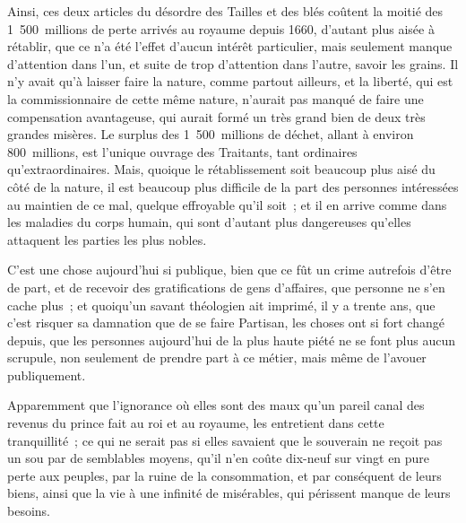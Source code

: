\documentclass[french,twoside]{book} %
\begin{document}
Ainsi, ces deux articles du désordre des Tailles et des blés coûtent la moitié des 1 500 millions de perte arrivés au royaume depuis 1660, d’autant plus aisée à rétablir, que ce n’a été l’effet d’aucun intérêt particulier, mais seulement manque d’attention dans l’un, et suite de trop d’attention dans l’autre, savoir les grains. Il n’y avait qu’à laisser faire la nature, comme partout ailleurs, et la liberté, qui est la commissionnaire de cette même nature, n’aurait pas manqué de faire une compensation avantageuse, qui aurait formé un très grand bien de deux très grandes misères. Le surplus des 1 500 millions de déchet, allant à environ 800 millions, est l’unique ouvrage des Traitants, tant ordinaires qu’extraordinaires. Mais, quoique le rétablissement soit beaucoup plus aisé du côté de la nature, il est beaucoup plus difficile de la part des personnes intéressées au maintien de ce mal, quelque effroyable qu’il soit ; et il en arrive comme dans les maladies du corps humain, qui sont d’autant plus dangereuses qu’elles attaquent les parties les plus nobles.\par
C’est une chose aujourd’hui si publique, bien que ce fût un crime autrefois d’être de part, et de recevoir des gratifications de gens d’affaires, que personne ne s’en cache plus ; et quoiqu’un savant théologien ait imprimé, il y a trente ans, que c’est risquer sa damnation que de se faire Partisan, les choses ont si fort changé depuis, que les personnes aujourd’hui de la plus haute piété ne se font plus aucun scrupule, non seulement de prendre part à ce métier, mais même de l’avouer publiquement.\par
Apparemment que l’ignorance où elles sont des maux qu’un pareil canal des revenus du prince fait au roi et au royaume, les entretient dans cette tranquillité ; ce qui ne serait pas si elles savaient que le souverain ne reçoit pas un sou par de semblables moyens, qu’il n’en coûte dix-neuf sur vingt en pure perte aux peuples, par la ruine de la consommation, et par conséquent de leurs biens, ainsi que la vie à une infinité de misérables, qui périssent manque de leurs besoins.\par
\end{document}
